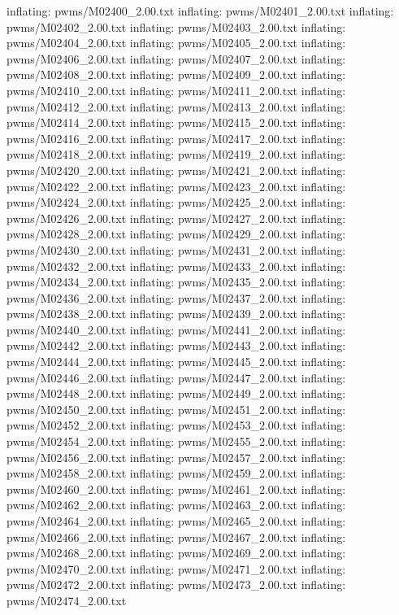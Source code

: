 \documentclass[letterpaper,10pt,english]{sphinxmanual}
\begin{document}
{\begin{sphinxVerbatim}[commandchars=\\\{\}]
  inflating: pwms/M02400\_2.00.txt
  inflating: pwms/M02401\_2.00.txt
  inflating: pwms/M02402\_2.00.txt
  inflating: pwms/M02403\_2.00.txt
  inflating: pwms/M02404\_2.00.txt
  inflating: pwms/M02405\_2.00.txt
  inflating: pwms/M02406\_2.00.txt
  inflating: pwms/M02407\_2.00.txt
  inflating: pwms/M02408\_2.00.txt
  inflating: pwms/M02409\_2.00.txt
  inflating: pwms/M02410\_2.00.txt
  inflating: pwms/M02411\_2.00.txt
  inflating: pwms/M02412\_2.00.txt
  inflating: pwms/M02413\_2.00.txt
  inflating: pwms/M02414\_2.00.txt
  inflating: pwms/M02415\_2.00.txt
  inflating: pwms/M02416\_2.00.txt
  inflating: pwms/M02417\_2.00.txt
  inflating: pwms/M02418\_2.00.txt
  inflating: pwms/M02419\_2.00.txt
  inflating: pwms/M02420\_2.00.txt
  inflating: pwms/M02421\_2.00.txt
  inflating: pwms/M02422\_2.00.txt
  inflating: pwms/M02423\_2.00.txt
  inflating: pwms/M02424\_2.00.txt
  inflating: pwms/M02425\_2.00.txt
  inflating: pwms/M02426\_2.00.txt
  inflating: pwms/M02427\_2.00.txt
  inflating: pwms/M02428\_2.00.txt
  inflating: pwms/M02429\_2.00.txt
  inflating: pwms/M02430\_2.00.txt
  inflating: pwms/M02431\_2.00.txt
  inflating: pwms/M02432\_2.00.txt
  inflating: pwms/M02433\_2.00.txt
  inflating: pwms/M02434\_2.00.txt
  inflating: pwms/M02435\_2.00.txt
  inflating: pwms/M02436\_2.00.txt
  inflating: pwms/M02437\_2.00.txt
  inflating: pwms/M02438\_2.00.txt
  inflating: pwms/M02439\_2.00.txt
  inflating: pwms/M02440\_2.00.txt
  inflating: pwms/M02441\_2.00.txt
  inflating: pwms/M02442\_2.00.txt
  inflating: pwms/M02443\_2.00.txt
  inflating: pwms/M02444\_2.00.txt
  inflating: pwms/M02445\_2.00.txt
  inflating: pwms/M02446\_2.00.txt
  inflating: pwms/M02447\_2.00.txt
  inflating: pwms/M02448\_2.00.txt
  inflating: pwms/M02449\_2.00.txt
  inflating: pwms/M02450\_2.00.txt
  inflating: pwms/M02451\_2.00.txt
  inflating: pwms/M02452\_2.00.txt
  inflating: pwms/M02453\_2.00.txt
  inflating: pwms/M02454\_2.00.txt
  inflating: pwms/M02455\_2.00.txt
  inflating: pwms/M02456\_2.00.txt
  inflating: pwms/M02457\_2.00.txt
  inflating: pwms/M02458\_2.00.txt
  inflating: pwms/M02459\_2.00.txt
  inflating: pwms/M02460\_2.00.txt
  inflating: pwms/M02461\_2.00.txt
  inflating: pwms/M02462\_2.00.txt
  inflating: pwms/M02463\_2.00.txt
  inflating: pwms/M02464\_2.00.txt
  inflating: pwms/M02465\_2.00.txt
  inflating: pwms/M02466\_2.00.txt
  inflating: pwms/M02467\_2.00.txt
  inflating: pwms/M02468\_2.00.txt
  inflating: pwms/M02469\_2.00.txt
  inflating: pwms/M02470\_2.00.txt
  inflating: pwms/M02471\_2.00.txt
  inflating: pwms/M02472\_2.00.txt
  inflating: pwms/M02473\_2.00.txt
  inflating: pwms/M02474\_2.00.txt

\end{sphinxVerbatim}}
\end{document}
